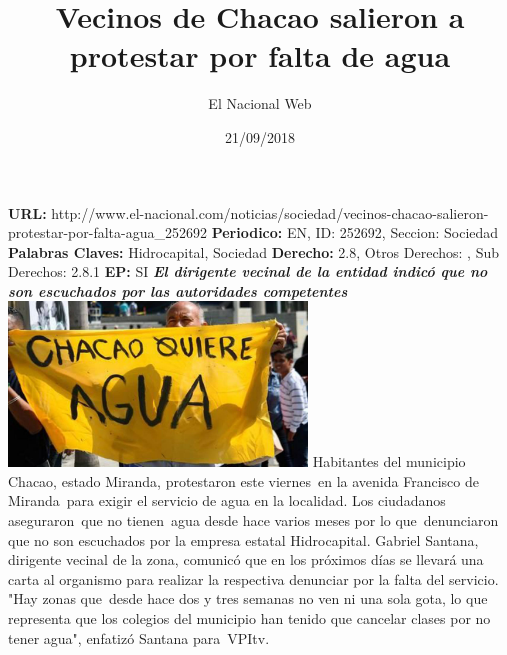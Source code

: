 \documentclass{article}%
\title{\textbf{Vecinos de Chacao salieron a protestar por falta de agua}}%
\author{El Nacional Web}%
\date{21/09/2018}%
\begin{document}
%
\normalsize%
\maketitle%
\textbf{URL: }%
http://www.el{-}nacional.com/noticias/sociedad/vecinos{-}chacao{-}salieron{-}protestar{-}por{-}falta{-}agua\_252692\newline%
%
\textbf{Periodico: }%
EN, %
ID: %
252692, %
Seccion: %
Sociedad\newline%
%
\textbf{Palabras Claves: }%
Hidrocapital, Sociedad\newline%
%
\textbf{Derecho: }%
2.8, %
Otros Derechos: %
, %
Sub Derechos: %
2.8.1\newline%
%
\textbf{EP: }%
SI\newline%
\newline%
%
\textbf{\textit{El dirigente vecinal de la entidad indicó que no son escuchados por las autoridades competentes}}%
\newline%
\newline%
%
\includegraphics[width=300px]{32.jpg}%
\newline%
%
Habitantes del municipio Chacao, estado Miranda, protestaron este viernes~en la avenida Francisco de Miranda~para exigir el servicio de agua en la localidad.%
\newline%
%
Los ciudadanos aseguraron~que no tienen~agua desde hace varios meses por lo que~denunciaron que no son escuchados por la empresa estatal Hidrocapital.%
\newline%
%
Gabriel Santana, dirigente vecinal de la zona, comunicó que en los próximos días se llevará una carta al organismo para realizar la respectiva denunciar por la falta del servicio.%
\newline%
%
"Hay zonas que~desde hace dos y tres semanas no ven ni una sola gota, lo que representa que los colegios del municipio han tenido que cancelar clases por no tener agua", enfatizó Santana para~VPItv.%
\newline%
%
\end{document}

